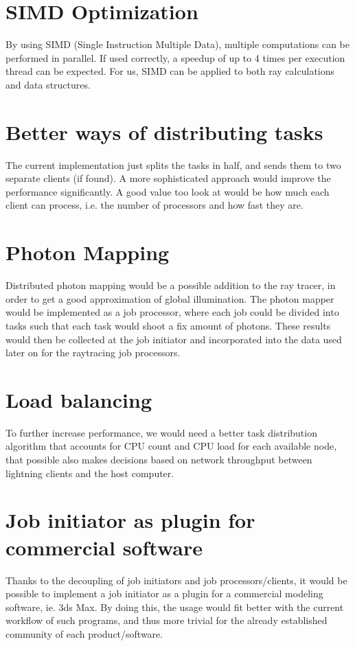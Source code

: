 \section{SIMD Optimization}
By using SIMD (Single Instruction Multiple Data), multiple computations can be performed in parallel. If used correctly, a speedup of up to 4 times per execution thread can be expected. For us, SIMD can be applied to both ray calculations and data structures.

\section{Better ways of distributing tasks}
The current implementation just splits the tasks in half, and sends them to two separate clients (if found). A more sophisticated approach would improve the performance significantly. A good value too look at would be how much each client can process, i.e. the number of processors and how fast they are.

\section{Photon Mapping}
Distributed photon mapping would be a possible addition to the ray tracer, in order to get a good approximation of global illumination. The photon mapper would be implemented as a job processor, where each job could be divided into tasks such that each task would shoot a fix amount of photons. These results would then be collected at the job initiator and incorporated into the data used later on for the raytracing job processors.

\section{Load balancing}
To further increase performance, we would need a better task distribution algorithm that accounts for CPU count and CPU load for each available node, that possible also makes decisions based on network throughput between lightning clients and the host computer.

\section{Job initiator as plugin for commercial software}
Thanks to the decoupling of job initiators and job processors/clients, it would be possible to implement a job initiator as a plugin for a commercial modeling software, ie. 3ds Max. By doing this, the usage would fit better with the current workflow of such programs, and thus more trivial for the already established community of each product/software.

